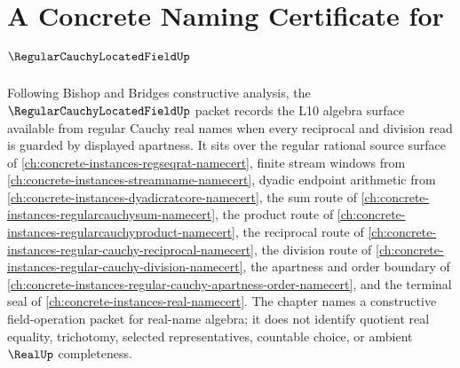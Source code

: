 \chapter{A Concrete Naming Certificate for $\RegularCauchyLocatedFieldUp$}
\label{ch:concrete-instances-regular-cauchy-located-field-namecert}

Following Bishop and Bridges constructive analysis, the $\RegularCauchyLocatedFieldUp$ packet records the L10 algebra surface available from regular Cauchy real names when every reciprocal and division read is guarded by displayed apartness. It sits over the regular rational source surface of \autoref{ch:concrete-instances-regseqrat-namecert}, finite stream windows from \autoref{ch:concrete-instances-streamname-namecert}, dyadic endpoint arithmetic from \autoref{ch:concrete-instances-dyadicratcore-namecert}, the sum route of \autoref{ch:concrete-instances-regularcauchysum-namecert}, the product route of \autoref{ch:concrete-instances-regularcauchyproduct-namecert}, the reciprocal route of \autoref{ch:concrete-instances-regular-cauchy-reciprocal-namecert}, the division route of \autoref{ch:concrete-instances-regular-cauchy-division-namecert}, the apartness and order boundary of \autoref{ch:concrete-instances-regular-cauchy-apartness-order-namecert}, and the terminal seal of \autoref{ch:concrete-instances-real-namecert}. The chapter names a constructive field-operation packet for real-name algebra; it does not identify quotient real equality, trichotomy, selected representatives, countable choice, or ambient $\RealUp$ completeness.

